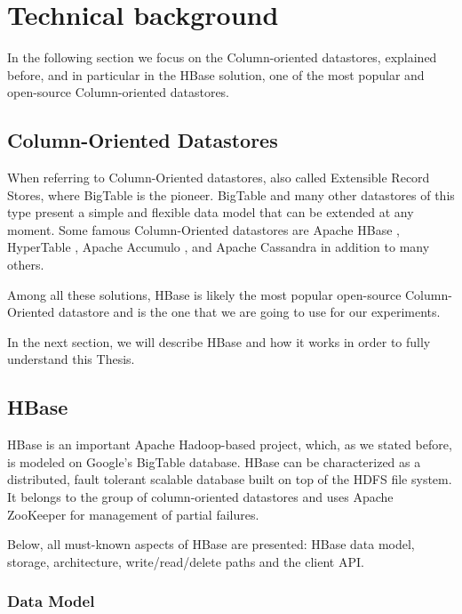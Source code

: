\chapter{Technical background}
\label{chapter:technical background} 

In the following section we focus on the Column-oriented datastores, explained before, and in particular in the HBase solution, one of the most popular and open-source Column-oriented datastores.

\section{Column-Oriented Datastores}

When referring to Column-Oriented datastores, also called Extensible Record Stores, where BigTable is the pioneer. BigTable and many other datastores of this type present a simple and flexible data model that can be extended at any moment.
Some famous Column-Oriented datastores are Apache HBase \cite{ApacheHBase}, HyperTable \cite{HyperTable}, Apache Accumulo \cite{ApacheAccumulo}, and Apache Cassandra \cite{ApacheCassandra} in addition to many others.
\par
Among all these solutions, HBase \cite{george2011hbase} is likely the most popular open-source Column-Oriented datastore and is the one that we are going to use for our experiments.
\par
In the next section, we will describe HBase and how it works in order to fully understand this Thesis.


\section{HBase}


HBase is an important Apache Hadoop-based project, which, as we stated before, is modeled on Google's BigTable database. HBase can be characterized as a distributed, fault tolerant scalable database built on top of the HDFS file system. It belongs to the group of column-oriented datastores and uses  Apache ZooKeeper for management of partial failures.
\par
Below, all must-known aspects of HBase are presented: HBase data model, storage, architecture, write/read/delete paths and the client API.


\subsection{Data Model}

